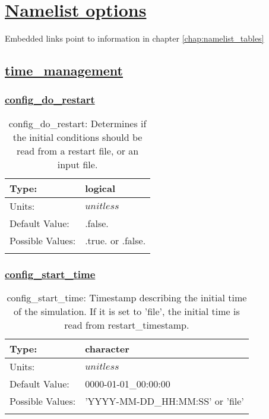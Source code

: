 \chapter[Namelist options]{\hyperref[chap:namelist_tables]{Namelist options}}
\label{chap:namelist_sections}
Embedded links point to information in chapter \ref{chap:namelist_tables}
\section[time\_management]{\hyperref[sec:nm_tab_time_management]{time\_management}}
\label{sec:nm_sec_time_management}
\subsection[config\_do\_restart]{\hyperref[sec:nm_tab_time_management]{config\_do\_restart}}
\label{subsec:nm_sec_config_do_restart}
\begin{center}
\begin{longtable}{| p{2.0in} | p{4.0in} |}
    \hline
    Type: & logical \\
    \hline
    Units: & $unitless$ \\
    \hline
    Default Value: & .false. \\
    \hline
    Possible Values: & .true. or .false. \\
    \hline
    \caption{config\_do\_restart: Determines if the initial conditions should be read from a restart file, or an input file.}
\end{longtable}
\end{center}
\subsection[config\_start\_time]{\hyperref[sec:nm_tab_time_management]{config\_start\_time}}
\label{subsec:nm_sec_config_start_time}
\begin{center}
\begin{longtable}{| p{2.0in} | p{4.0in} |}
    \hline
    Type: & character \\
    \hline
    Units: & $unitless$ \\
    \hline
    Default Value: & 0000-01-01\_00:00:00 \\
    \hline
    Possible Values: & 'YYYY-MM-DD\_HH:MM:SS' or 'file' \\
    \hline
    \caption{config\_start\_time: Timestamp describing the initial time of the simulation. If it is set to 'file', the initial time is read from restart\_timestamp.}
\end{longtable}
\end{center}
